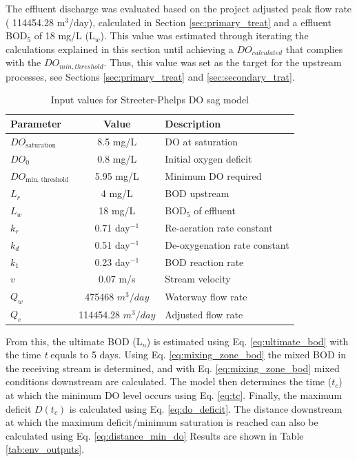 \documentclass[11pt]{article}
\begin{document}
The effluent discharge was evaluated based on the project adjusted 
peak flow rate (
114454.28
m$^3$/day), calculated in Section \ref{sec:primary_treat} and a effluent BOD$_5$ of 
18
mg/L (L$_w$). This value was estimated through iterating the calculations explained 
in this section until achieving a $DO_{calculated}$ that complies 
with the $DO_{min, threshold}$. Thus, this value was set as the 
target for the upstream processes, 
see Sections \ref{sec:primary_treat} and \ref{sec:secondary_trat}. 

\begin{table}[h]
  \centering
  \caption{Input values for Streeter-Phelps DO sag model}
  \label{tab:env_inputs}
  \begin{tabular}{|l|c|l|}
  \hline
  \textbf{Parameter} & \textbf{Value} & \textbf{Description} \\
  \hline
  $DO_{\text{saturation}}$ & 8.5 mg/L & DO at saturation \\
  $DO_0$ & 0.8 mg/L & Initial oxygen deficit \\
  $DO_{\text{min, threshold}}$ & 5.95 mg/L & Minimum DO required \\
  $L_r$ & 4 mg/L & BOD upstream \\
  $L_w$ & 
18
  mg/L & BOD$_5$ of effluent \\
  $k_r$ & 0.71 day$^{-1}$ & Re-aeration rate constant \\
  $k_d$ & 0.51 day$^{-1}$ & De-oxygenation rate constant \\
  $k_1$ & 0.23 day$^{-1}$ & BOD reaction rate \\
  $v$ & 0.07 m/s & Stream velocity \\
  $Q_w$ & 475468 $m^3/day$ & Waterway flow rate\\
  $Q_e$ &
114454.28
  $m^3/day$ & Adjusted flow rate\\
  \hline
  \end{tabular}
\end{table}


From this, the ultimate BOD (L$_u$) is estimated using Eq. \eqref{eq:ultimate_bod} with the time \textit{t} 
equals to 5 days. Using Eq. \eqref{eq:mixing_zone_bod} the mixed BOD in the receiving stream is
determined, and with Eq. \eqref{eq:mixing_zone_bod} mixed conditions downstream are calculated.
The model then determines the time ($t_c$) at which the minimum DO level occurs using Eq. \eqref{eq:tc}. 
Finally, the maximum deficit $D(t_c)$ is calculated using Eq. \eqref{eq:do_deficit}.
The distance downstream at which the maximum deficit/minimum saturation 
is reached can also be calculated using Eq. \eqref{eq:distance_min_do} Results are 
shown in Table \ref{tab:env_outputs}.
\end{document}
